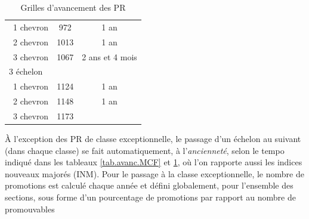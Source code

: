 \begin{center}
\begin{table}[t!]
\begin{center}
{\begin{tabular}{lcc}
~\hspace{1cm}1\ier{} chevron &972&1 an\\
~\hspace{1cm}2\ieme{} chevron &1013&1 an\\
~\hspace{1cm}3\ieme{} chevron &1067&2 ans et 4 mois \\
3\ieme{} \'echelon & &  \\
~\hspace{1cm}1\ier{} chevron &1124&1 an\\
~\hspace{1cm}2\ieme{} chevron &1148&1 an\\
~\hspace{1cm}3\ieme{} chevron &1173& \\
\bottomrule
\end{tabular}
}

\caption{Grilles d'avancement des PR}\label{tab.avanc.PR}
\end{center}
\end{table}
\end{center}




\`A l'exception des PR de classe exceptionnelle,
le passage d'un \'echelon au suivant (dans chaque classe) se fait
automatiquement, \`a l'{\em anciennet\'e}, selon le tempo indiqu\'e
dans les tableaux \ref{tab.avanc.MCF} et \ref{tab.avanc.PR}, o\`u l'on rapporte aussi les indices
nouveaux major\'es (INM). Pour le passage \`a la classe exceptionnelle, le nombre de promotions est calcul\'e chaque ann\'ee et d\'efini globalement, pour l'ensemble des sections, sous forme d'un pourcentage de promotions par rapport au nombre de \og promouvables\fg{} 

